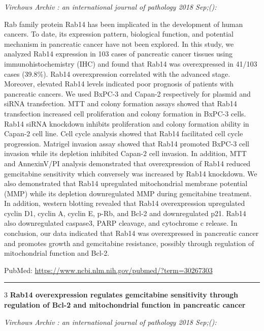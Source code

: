 \documentclass[]{article}
\begin{document}
\emph{Virchows Archiv : an international journal of pathology 2018
Sep;():}

Rab family protein Rab14 has been implicated in the development of human
cancers. To date, its expression pattern, biological function, and
potential mechanism in pancreatic cancer have not been explored. In this
study, we analyzed Rab14 expression in 103 cases of pancreatic cancer
tissues using immunohistochemistry (IHC) and found that Rab14 was
overexpressed in 41/103 cases (39.8\%). Rab14 overexpression correlated
with the advanced stage. Moreover, elevated Rab14 levels indicated poor
prognosis of patients with pancreatic cancers. We used BxPC-3 and
Capan-2 respectively for plasmid and siRNA transfection. MTT and colony
formation assays showed that Rab14 transfection increased cell
proliferation and colony formation in BxPC-3 cells. Rab14 siRNA
knockdown inhibits proliferation and colony formation ability in Capan-2
cell line. Cell cycle analysis showed that Rab14 facilitated cell cycle
progression. Matrigel invasion assay showed that Rab14 promoted BxPC-3
cell invasion while its depletion inhibited Capan-2 cell invasion. In
addition, MTT and AnnexinV/PI analysis demonstrated that overexpression
of Rab14 reduced gemcitabine sensitivity which conversely was increased
by Rab14 knockdown. We also demonstrated that Rab14 upregulated
mitochondrial membrane potential (MMP) while its depletion downregulated
MMP during gemcitabine treatment. In addition, western blotting revealed
that Rab14 overexpression upregulated cyclin D1, cyclin A, cyclin E,
p-Rb, and Bcl-2 and downregulated p21. Rab14 also downregulated
caspase3, PARP cleavage, and cytochrome c release. In conclusion, our
data indicated that Rab14 was overexpressed in pancreatic cancer and
promotes growth and gemcitabine resistance, possibly through regulation
of mitochondrial function and Bcl-2.

PubMed: \url{https://www.ncbi.nlm.nih.gov/pubmed/?term=30267303}

{}

{}

\begin{center}\rule{0.5\linewidth}{\linethickness}\end{center}

3 \textbf{Rab14 overexpression regulates gemcitabine sensitivity through
regulation of Bcl-2 and mitochondrial function in pancreatic cancer}

\emph{Virchows Archiv : an international journal of pathology 2018
Sep;():}
\end{document}
